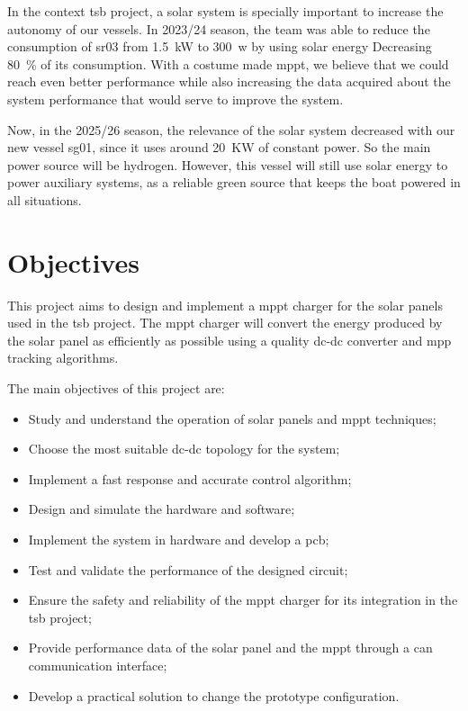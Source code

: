 In the context \ac{tsb} project, a solar system is specially important to increase the autonomy of our vessels. In 2023/24 season, the team was able to reduce the consumption of \ac{sr03} from 1.5~kW to 300~w by using solar energy
Decreasing 80~\% of its consumption. With a costume made \ac{mppt}, we believe that we could reach even better performance while also increasing the data acquired about the system performance that would serve to improve the system.

Now, in the 2025/26 season, the relevance of the solar system decreased with our new vessel \ac{sg01}, since it uses around 20~KW of constant power. So the main power source will be hydrogen. However, this vessel will still use solar energy to power auxiliary systems, as a reliable green source that keeps the boat powered in all situations.

\section{Objectives} 

This project aims to design and implement a \ac{mppt} charger for the solar panels used in the \ac{tsb} project. The \ac{mppt} charger will convert the energy produced by the solar panel as efficiently as possible using a quality \acs{dc}-\acs{dc} converter and \ac{mpp} tracking algorithms.

The main objectives of this project are:

\begin{itemize}[leftmargin=4em, itemsep=1pt, topsep=2pt]
    \item Study and understand the operation of solar panels and \ac{mppt} techniques;
    \item Choose the most suitable \acs{dc}-\acs{dc} topology for the system;
    \item Implement a fast response and accurate control algorithm;
    \item Design and simulate the hardware and software;
    \item Implement the system in hardware and develop a \ac{pcb};
    \item Test and validate the performance of the designed circuit;
    \item Ensure the safety and reliability of the \ac{mppt} charger for its integration in the \ac{tsb} project;
    \item Provide performance data of the solar panel and the \ac{mppt} through a \ac{can} communication interface;
    \item Develop a practical solution to change the prototype configuration.
\end{itemize} 


